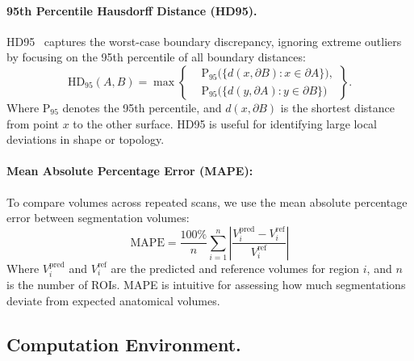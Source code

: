 \documentclass{midl} %
\begin{document}
\paragraph{95th Percentile Hausdorff Distance (HD95).}
HD95~\cite{huttenlocher1993comparing} captures the worst-case boundary discrepancy, ignoring extreme outliers by focusing on the 95th percentile of all boundary distances:
\begin{equation}
\label{eq:hd95}
\mathrm{HD}_{95}(A,B) =
\max\left\{
\begin{aligned}
&\mathrm{P}_{95}\big(\{ d(x,\partial B) : x \in \partial A \}\big),\\
&\mathrm{P}_{95}\big(\{ d(y,\partial A) : y \in \partial B \}\big)
\end{aligned}
\right\}.
\end{equation}
Where $\mathrm{P}_{95}$ denotes the 95th percentile, and $d(x, \partial B)$ is the shortest distance from point $x$ to the other surface. HD95 is useful for identifying large local deviations in shape or topology.

\paragraph{Mean Absolute Percentage Error (MAPE):}
To compare volumes across repeated scans, we use the mean absolute percentage error between segmentation volumes:
\begin{equation}
\mathrm{MAPE} = \frac{100\%}{n} \sum_{i=1}^n \left| \frac{V_i^{\text{pred}} - V_i^{\text{ref}}}{V_i^{\text{ref}}} \right|
\label{eq:mape}
\end{equation}
Where $V_i^{\text{pred}}$ and $V_i^{\text{ref}}$ are the predicted and reference volumes for region $i$, and $n$ is the number of ROIs. MAPE is intuitive for assessing how much segmentations deviate from expected anatomical volumes.

\subsection{Computation Environment.}
\end{document}
